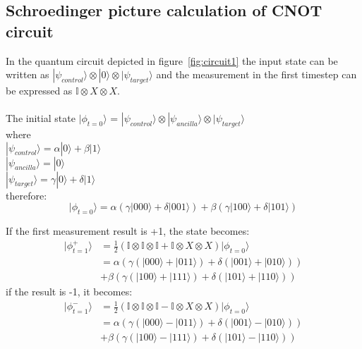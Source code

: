 \subsection{Schroedinger picture calculation of CNOT circuit}
\label{sec:calc1}

In the quantum circuit depicted in figure~\ref{fig:circuit1}
the input
state can be written as $|\psi_{control}\rangle \otimes |0\rangle 
\otimes |\psi_{target}\rangle$ and the measurement in the first 
timestep can be expressed as $\mathbb{I}\otimes X \otimes X$.\\
\\
The initial state $|\phi_{t=0}\rangle$ = $|\psi_{control}\rangle \otimes |\psi_{ancilla}\rangle \otimes
|\psi_{target}\rangle$\\
where\\
$|\psi_{control}\rangle = \alpha|0\rangle+\beta|1\rangle$
\\
$|\psi_{ancilla}\rangle = |0\rangle$
\\
$|\psi_{target}\rangle = \gamma|0\rangle+\delta|1\rangle$
\\
therefore:
\begin{equation}
|\phi_{t=0}\rangle = \alpha \left( \gamma |000\rangle + \delta |001\rangle\right)+
\beta \left( \gamma |100\rangle + \delta |101\rangle \right)
\end{equation}

If the first measurement result is +1, the state becomes:
\begin{align*}
	|\phi^{+}_{t=1}\rangle 
	&= \frac{1}{2}\left(\mathbb{I}\otimes\mathbb{I}\otimes\mathbb{I}+
	\mathbb{I}\otimes X \otimes X\right)|\phi_{t=0}\rangle\\
	&= \alpha \left( 
	\gamma \left( |000\rangle + |011\rangle \right) +
	\delta \left( |001\rangle + |010\rangle \right) \right) \\
	&+ \beta \left(
	\gamma \left( |100\rangle + |111\rangle \right) +
	\delta \left( |101\rangle + |110\rangle \right) \right)
\end{align*}
if the result is -1, it becomes:
\begin{align*}
	|\phi^{-}_{t=1}\rangle 
	&= \frac{1}{2}\left(\mathbb{I}\otimes\mathbb{I}\otimes\mathbb{I}-
	\mathbb{I}\otimes X \otimes X\right)|\phi_{t=0}\rangle\\
	&= \alpha \left( 
	\gamma \left( |000\rangle - |011\rangle \right) +
	\delta \left( |001\rangle - |010\rangle \right) \right) \\
	&+ \beta \left(
	\gamma \left( |100\rangle - |111\rangle \right) +
	\delta \left( |101\rangle - |110\rangle \right) \right)
\end{align*}

